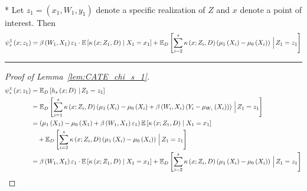 \begin{lem}\label{lem:CATE_chi_s_1}\mbox{}\\*
	Let $z_1 = (x_1, W_{1}, y_1)$ denote a specific realization of $Z$ and $x$ denote a point of interest.
	Then
	\begin{equation}
		\psi_{s}^{1}\left(x; z_1\right)
		= \beta\left(W_{1}, X_1\right)\varepsilon_{1} \cdot \mathbb{E}\left[\kappa\left(x; Z_1, D\right) \; \middle| \; X_1 = x_1\right]
		+ \mathbb{E}_{D}\left[\sum_{i = 2}^{s} \kappa\left(x; Z_{i}, D\right) \left(\mu_{1}\left(X_{i}\right) - \mu_{0}\left(X_{i}\right)\right)
		\, \Big| \, Z_1 = z_1 \right]
	\end{equation}
\end{lem}
\hrule
\begin{proof}[Proof of Lemma~\ref{lem:CATE_chi_s_1}]
	\begin{equation}
		\begin{aligned}
			\psi_{s}^{1}\left(x; z_1\right)
			 & = \mathbb{E}_{D}\left[h_{s}\left(x; D\right) \, | \, Z_1 = z_1 \right] \\
			 & = \mathbb{E}_{D}\left[\sum_{i = 1}^{s} \kappa\left(x; Z_{i}, D\right) \left(\mu_{1}\left(X_{i}\right) - \mu_{0}\left(X_{i}\right) + \beta\left(W_{i}, X_{i}\right)\left(Y_{i} - \mu_{W_{i}}\left(X_{i}\right)\right)\right)
			 \, \Big| \, Z_1 = z_1 \right]\\
			 & = \left(\mu_{1}\left(X_1\right) - \mu_{0}\left(X_1\right) + \beta\left(W_{1}, X_1\right)\varepsilon_{1}\right)\mathbb{E}\left[\kappa\left(x; Z_1, D\right) \; \middle| \; X_1 = x_1\right]\\
			 & \quad + \mathbb{E}_{D}\left[\sum_{i = 2}^{s} \kappa\left(x; Z_{i}, D\right) \left(\mu_{1}\left(X_{i}\right) - \mu_{0}\left(X_{i}\right)\right)
			 \, \Big| \, Z_1 = z_1 \right]\\
			 & = \beta\left(W_{1}, X_1\right)\varepsilon_{1} \cdot \mathbb{E}\left[\kappa\left(x; Z_1, D\right) \; \middle| \; X_1 = x_1\right]
			 + \mathbb{E}_{D}\left[\sum_{i = 2}^{s} \kappa\left(x; Z_{i}, D\right) \left(\mu_{1}\left(X_{i}\right) - \mu_{0}\left(X_{i}\right)\right)
			 \, \Big| \, Z_1 = z_1 \right]
		\end{aligned}
	\end{equation}
\end{proof}


